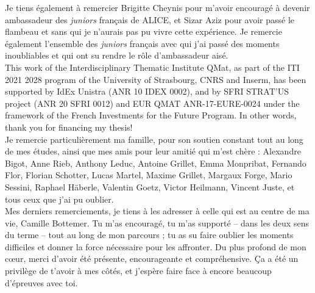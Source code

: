 Je tiens également à remercier Brigitte Cheynis pour m'avoir encouragé à devenir ambassadeur des \textit{juniors} français de ALICE, et Sizar Aziz pour avoir passé le flambeau et sans qui je n'aurais pas pu vivre cette expérience. Je remercie également l'ensemble des \textit{juniors} français avec qui j'ai passé des moments inoubliables et qui ont su rendre le rôle d'ambassadeur aisé.\\

This work of the Interdisciplinary Thematic Institute QMat, as part of the ITI 2021 2028 program of the University of Strasbourg, CNRS and Inserm, has been supported by IdEx Unistra (ANR 10 IDEX 0002), and by SFRI STRAT’US project (ANR 20 SFRI 0012) and EUR QMAT ANR-17-EURE-0024 under the framework of the French Investments for the Future Program. In other words, thank you for financing my thesis!\\

Je remercie particulièrement ma famille, pour son soutien constant tout au long de mes études, ainsi que mes amis pour leur amitié qui m'est chère : Alexandre Bigot, Anne Rieb, Anthony Leduc, Antoine Grillet, Emma Monpribat, Fernando Flor, Florian Schotter, Lucas Martel, Maxime Grillet, Margaux Forge, Mario Sessini, Raphael H\"aberle, Valentin Goetz, Victor Heilmann, Vincent Juste, et tous ceux que j'ai pu oublier. \\

Mes derniers remerciements, je tiens à les adresser à celle qui est au centre de ma vie, Camille Bottemer. Tu m'as encouragé, tu m'as supporté -- dans les deux sens du terme -- tout au long de mon parcours ; tu as su faire oublier les moments difficiles et donner la force nécessaire pour les affronter. Du plus profond de mon c\oe{}ur, merci d'avoir été présente, encourageante et compréhensive. Ça a été un privilège de t'avoir à mes côtés, et j'espère faire face à encore beaucoup d'épreuves avec toi.

